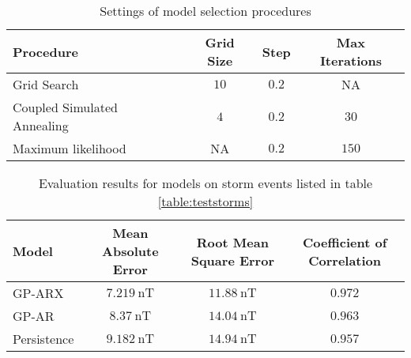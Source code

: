     \begin{table}[h]
    \centering
    \caption{Settings of model selection procedures}
    \begin{tabular}{l c c c}
    \hline
    Procedure & Grid Size & Step & Max Iterations \\
    \hline
    Grid Search & $10$ & $0.2$ & NA \\
    Coupled Simulated Annealing & $4$ & $0.2$ & $30$ \\
    Maximum likelihood & NA & $0.2$ & $150$\\
    \end{tabular}
    \label{table:modelselection}
    \end{table}
    
    
    \begin{table}[h]
    \centering
    \caption{Evaluation results for models on storm events listed in table \ref{table:teststorms}}
    \label{table:results}
    \begin{tabular}{l c c c}
    \hline
    Model & Mean Absolute Error & Root Mean Square Error & Coefficient of Correlation\\ \hline
    GP-ARX & $\SI{7.219}{\nano\tesla}$ & $\SI{11.88}{\nano\tesla}$ & $0.972$\\
    GP-AR & $\SI{8.37}{\nano\tesla}$ & $\SI{14.04}{\nano\tesla}$ & $0.963$\\
    Persistence & $\SI{9.182}{\nano\tesla}$ & $\SI{14.94}{\nano\tesla}$ & $0.957$\\
    \end{tabular}
    \end{table}
    
